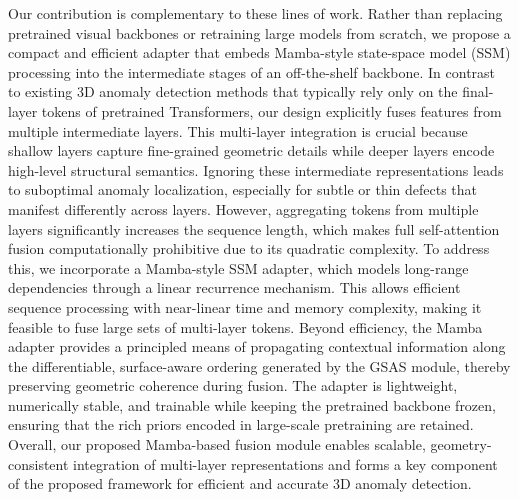 Our contribution is complementary to these lines of work. Rather than replacing pretrained visual backbones or retraining large models from scratch, we propose a compact and efficient adapter that embeds Mamba-style state-space model (SSM) processing into the intermediate stages of an off-the-shelf backbone. In contrast to existing 3D anomaly detection methods that typically rely only on the final-layer tokens of pretrained Transformers, our design explicitly fuses features from multiple intermediate layers. This multi-layer integration is crucial because shallow layers capture fine-grained geometric details while deeper layers encode high-level structural semantics. Ignoring these intermediate representations leads to suboptimal anomaly localization, especially for subtle or thin defects that manifest differently across layers. However, aggregating tokens from multiple layers significantly increases the sequence length, which makes full self-attention fusion computationally prohibitive due to its quadratic complexity. To address this, we incorporate a Mamba-style SSM adapter, which models long-range dependencies through a linear recurrence mechanism. This allows efficient sequence processing with near-linear time and memory complexity, making it feasible to fuse large sets of multi-layer tokens. Beyond efficiency, the Mamba adapter provides a principled means of propagating contextual information along the differentiable, surface-aware ordering generated by the GSAS module, thereby preserving geometric coherence during fusion. The adapter is lightweight, numerically stable, and trainable while keeping the pretrained backbone frozen, ensuring that the rich priors encoded in large-scale pretraining are retained. Overall, our proposed Mamba-based fusion module enables scalable, geometry-consistent integration of multi-layer representations and forms a key component of the proposed framework for efficient and accurate 3D anomaly detection.

 
